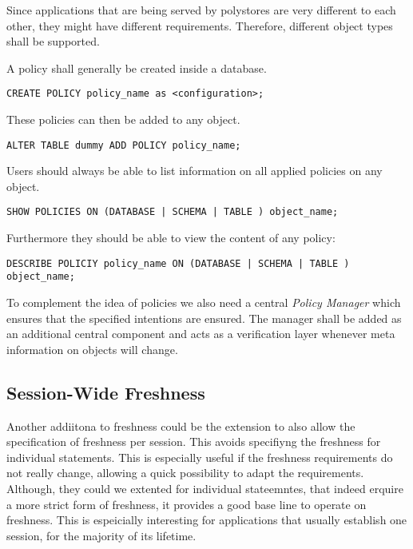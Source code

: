 
Since applications that are being served by polystores are very different to each other, they might have different requirements. 
Therefore, different object types shall be supported.

A policy shall generally be created inside a database.
\begin{verbatim}
CREATE POLICY policy_name as <configuration>;
\end{verbatim}

These policies can then be added to any object.
\begin{verbatim}
ALTER TABLE dummy ADD POLICY policy_name;
\end{verbatim}

Users should always be able to list information on all applied policies on any object.
\begin{verbatim}
SHOW POLICIES ON (DATABASE | SCHEMA | TABLE ) object_name;
\end{verbatim}


Furthermore they should be able to view the content of any policy: 
\begin{verbatim}
DESCRIBE POLICIY policy_name ON (DATABASE | SCHEMA | TABLE ) object_name; 
\end{verbatim}

To complement the idea of policies we also need a central \emph{Policy Manager} which ensures that the specified intentions are ensured.
The manager shall be added as an additional central component and acts as a verification layer whenever meta information on objects will change.


\subsection{Session-Wide Freshness}
Another addiitona to freshness could be the extension to also allow the specification
of freshness per session. This avoids specifiyng the freshness for individual statements.
This is especially useful if the freshness requirements do not really change, allowing a quick
possibility to adapt the requirements. Although, they could we extented for individual stateemntes,
that indeed erquire a more strict form of freshness, it provides a good base line to operate on freshness.
This is espeicially interesting for applications that usually establish one session,
for the majority of its lifetime. 

